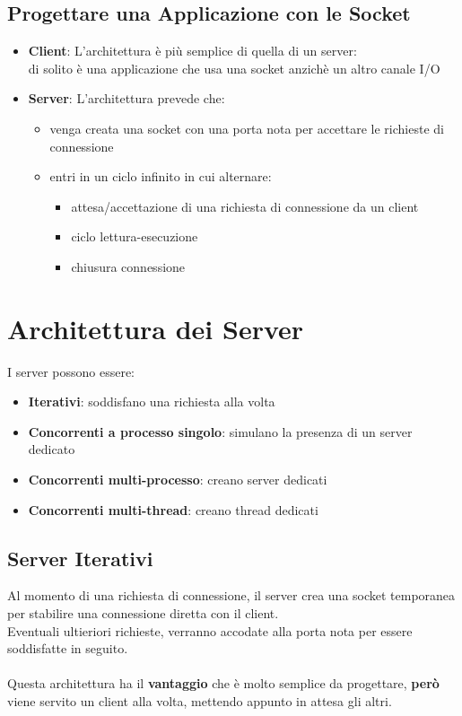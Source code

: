 \documentclass[12pt, a4paper]{article}
\begin{document}
    \subsection{Progettare una Applicazione con le Socket}
    \begin{itemize}
        \item \textbf{Client}: L'architettura è più semplice di quella di un server:
        \\di solito è una applicazione che usa una socket anzichè un altro canale I/O
        \item \textbf{Server}: L'architettura prevede che:
        \begin{itemize}
            \item venga creata una socket con una porta nota per accettare le richieste di connessione
            \item entri in un ciclo infinito in cui alternare:
            \begin{itemize}
                \item attesa/accettazione di una richiesta di connessione da un client
                \item ciclo lettura-esecuzione
                \item chiusura connessione
            \end{itemize}        
        \end{itemize}
    \end{itemize}

    \newpage

    \section{Architettura dei Server}
    I server possono essere:
    \begin{itemize}
        \item \textbf{Iterativi}: soddisfano una richiesta alla volta
        \item \textbf{Concorrenti a processo singolo}: simulano la presenza di un server dedicato
        \item \textbf{Concorrenti multi-processo}: creano server dedicati
        \item \textbf{Concorrenti multi-thread}: creano thread dedicati
    \end{itemize}

    \subsection{Server Iterativi}
    Al momento di una richiesta di connessione, il server crea una socket 
    temporanea per stabilire una connessione diretta con il client.
    \\Eventuali ultieriori richieste, verranno accodate alla porta nota per essere soddisfatte in seguito.
    \\\\
    Questa architettura ha il \textbf{vantaggio} che è molto semplice da progettare, \textbf{però} viene servito un client alla volta,
    mettendo appunto in attesa gli altri. 
\end{document}
